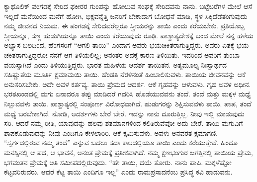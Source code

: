 ಕ್ಯಾಥೊಲಿಕ್​ ಪಂಗಡಕ್ಕೆ ಸೇರಿದ ಫಕೀರರ ಗುಂಪನ್ನು ಹೋಲುವ ಸಂಘಕ್ಕೆ ಸೇರಿದವನು ನಾನು. ಬಟ್ಟೆಬರೆಗಳ ಮೇಲೆ ಆಸೆ ಇಲ್ಲದೆ ಮನೆಯಿಂದ ಮನೆಗೆ ಹೋಗಿ, ಭಿಕ್ಷವನ್ನೆತ್ತಿ ಜನರಿಗೆ ಬೇಕಾದಾಗ ಬೋಧನೆ ಮಾಡಿ, ಸ್ಥಳ ಸಿಕ್ಕಿದೆಡೆತಂಗುವುದು ನಮ್ಮ ಜೀವನದ ನಿಯಮ. ಈ ಪಂಗಡಕ್ಕೆ ಸೇರಿದವರೆಲ್ಲರೂ ಸ್ತ್ರೀಯರನ್ನು ತಾಯಿ ಎಂದು ಕರೆಯಬೇಕು. ಪ್ರತಿಯೊಬ್ಬ ಸ್ತ್ರೀಯನ್ನೂ, ಸಣ್ಣ ಹುಡುಗಿಯನ್ನೂ ತಾಯಿ ಎಂದು ಕರೆಯುವುದು ರೂಢಿ. ಪಾಶ್ಚಾತ್ಯದೇಶಕ್ಕೆ ಬಂದ ಮೇಲೆ ನನ್ನ ಹಳೆಯ ಅಭ್ಯಾಸ ಬಲದಿಂದ, ಹೆಂಗಸರಿಗೆ “ಆಗಲಿ ತಾಯಿ” ಎಂದಾಗ ಅವರು ಭಯಚಿಕಿತರಾಗುತ್ತಿದ್ದರು. ಅವರು ಏತಕ್ಕೆ ಭಯ ಚಕಿತರಾಗುತ್ತಿದ್ದರೋ ನನಗೆ ಆಗ ತಿಳಿಯಲಿಲ್ಲ; ಅನಂತರ ಅದಕ್ಕೆ ಕಾರಣ ತಿಳಿಯಿತು. ಇದರಿಂದ ಅವರಿಗೆ ತುಂಬಾ ವಯಸ್ಸಾಗಿದೆ ಎಂದು ತಿಳಿಯುತ್ತಿದ್ದರು. ಭಾರತ ಮಹಿಳೆಯ ಆದರ್ಶ ತಾಯಿತನ. ಅತ್ಯಮೂಲ್ಯ ನಿಃಸ್ವಾರ್ಥದ ಸಹಿಷ್ಣುತೆಯ ಮೂರ್ತಿ ಕ್ಷಮಾಮಯಿ ತಾಯಿ. ಹೆಂಡತಿ ನೆರಳಿನಂತೆ ಹಿಂಬಾಲಿಸುವಳು. ತಾಯಿಯ ಜೀವನವನ್ನು ಆಕೆ ಅನುಸರಿಸಬೇಕು. ಅದೇ ಅವಳ ಕರ್ತವ್ಯ. ತಾಯಿ ಪ್ರೇಮದ ಆದರ್ಶ. ಆಕೆ ಗೃಹವನ್ನು ಆಳುವಳು. ಗೃಹ ಅವಳ ಅಧೀನ. ಭರತಖಂಡದಲ್ಲಿ ಮಗು ಏನಾದರೂ ತಪ್ಪು ಮಾಡಿದರೆ ಗದರಿಸಿ ಹೊಡೆಯುವವನು ತಂದೆ. ತಂದೆ ಮತ್ತು ಮಕ್ಕಳ ಮಧ್ಯೆ ನಿಲ್ಲುವವಳು ತಾಯಿ. ಪಾಶ್ಚಾತ್ಯರಲ್ಲಿ ಸಂಪೂರ್ಣ ವಿರೋಧವಾಗಿದೆ. ಹುಡುಗರನ್ನು ಶಿಕ್ಷಿಸುವವಳು ತಾಯಿ. ಪಾಪ, ತಂದೆ ಮಧ್ಯೆ ಬರಬೇಕಾಗಿದೆ. ನೋಡಿ, ಆದರ್ಶಗಳು ಬೇರೆ ಬೇರೆ. ಇದನ್ನು ನಾನು ದೂರುತ್ತಿಲ್ಲ. ನೀವು ಇಲ್ಲಿ ಮಾಡುವುದು ಸರಿ. ಆದರೆ ನಮ್ಮ ರೀತಿ, ಯಾವುದನ್ನು ಹಲವು ಶತಮಾನಗಳಿಂದ ಕಲಿತಿರುವೆವೋ ಅದು ಬೇರೆ. ತಾಯಿ ಮಗುವಿಗೆ ಶಾಪಕೊಡುವುದನ್ನು ನೀವು ಎಂದಿಗೂ ಕೇಳಲಾರಿರಿ. ಆಕೆ ಕ್ಷಮಿಸುವಳು. ಅವಳು ಅನವರತ ಕ್ಷಮಾಗಣಿ. “ಸ್ವರ್ಗದಲ್ಲಿರುವ ನಮ್ಮ ತಂದೆ” ಎನ್ನುವ ಬದಲು ಸದಾ ಕಾಲದಲ್ಲಿಯೂ ತಾಯಿ ಎಂದು ಕರೆಯುತ್ತೇವೆ. ಹಿಂದೂ ಮನಸ್ಸಿನಲ್ಲಿ ಆ ಪದ, ಆ ಭಾವನೆ, ಅನಂತ ಪ್ರೇಮಕ್ಕೆ ಪ್ರತೀಕವಾಗಿದೆ. ನಮ್ಮ ಕ್ಷಣಭಂಗುರ ಜಗತ್ತಿನಲ್ಲಿ ತಾಯಿಯ ಪ್ರೇಮ, ಭಗವಂತನ ಪ್ರೇಮಕ್ಕೆ ಅತಿ ಸಮೀಪದಲ್ಲಿರುವುದು. “ಹೇ ತಾಯಿ, ದಯೆ ತೋರು. ನಾನು ಪಾಪಿ. ಮಕ್ಕಳೆಷ್ಟೋ ಕೆಟ್ಟವರಿರುವರು. ಆದರೆ ಕೆಟ್ಟ ತಾಯಿ ಎಂದಿಗೂ ಇಲ್ಲ” ಎಂದು ರಾಮಪ್ರಸಾದನೆಂಬ ಪ್ರಸಿದ್ಧ ಕವಿ ಹಾಡುವನು.

